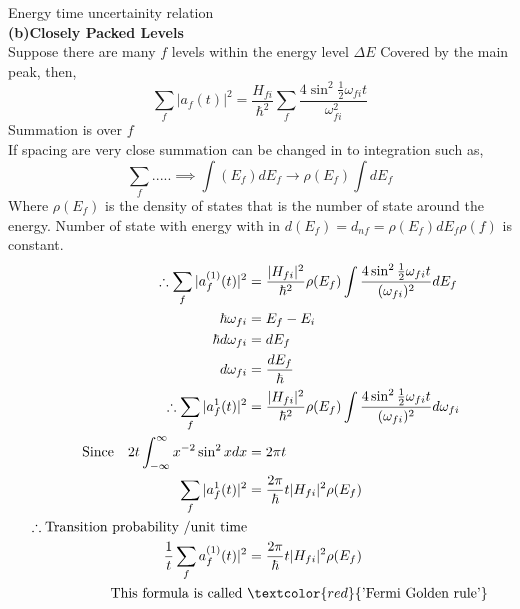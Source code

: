 Energy time uncertainity relation\\
\textbf{(b)\quad Closely Packed Levels}\\
Suppose there are many $f$ levels within the energy level $\Delta E$ Covered by the main peak, then,\\
$$\sum_{f}|a_f(t)|^2=\frac{H_{fi}}{\hbar^2}\sum_{f}\frac{4\sin^2 \frac{1}{2}\omega_{fi}t}{\omega^2_{fi}}$$
Summation is over $f$\\
If spacing are very close summation can be changed in to integration such as,
$$\sum_{f}.....\implies \int(E_f)dE_f\rightarrow\rho(E_f)\int dE_f$$
Where $\rho(E_f)$ is the density of states that is the number of state around the energy. 
Number of state with energy with in $d(E_f)=d_{nf}=\rho(E_f)dE_f \rho(f)$ is constant.
	$$
	\begin{aligned}
	\therefore \sum_{f}|a^{(1)}_f(t)|^2&=\frac{|H_{fi}|^2}{\hbar^2}\rho(E_f)\int\frac{4\sin^2\frac{1}{2}\omega_{fi}t}{(\omega_{fi})^2}dE_f\\
	\hbar\omega_{fi}&=E_f-E_i\\
	\hbar d\omega_{fi}&=dE_f\\
	 d\omega_{fi}&=\frac{dE_f}{\hbar}\\
	\therefore\sum_{f}|a^{1}_f(t)|^2&=\frac{|H_{fi}|^2}{\hbar^2}\rho(E_f)\int\frac{4\sin^2\frac{1}{2}\omega_{fi}t}{(\omega_{fi})^2}d\omega_{fi}\\
	\text{Since} \quad 2t\int_{-\infty}^{\infty}x^{-2}\sin^2xdx&=2\pi t\\
	\sum_{f}|a^{1}_f(t)|^2&=\frac{2\pi}{\hbar}t|H_{fi}|^2\rho(E_f)\\
	\therefore \text{Transition probability /unit time}\\
	\frac{1}{t}\sum_{f}a^{(1)}_f(t)|^2&=\frac{2\pi}{\hbar}t|H_{fi}|^2\rho(E_f)\\
	\text{This formula is called }&\textcolor{red}{\text{'Fermi Golden rule'}}
\end{aligned}
$$
